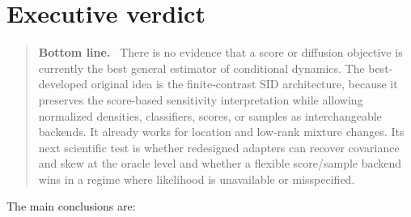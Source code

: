 \documentclass[10pt]{article}
\newenvironment{takeaway}
  {\begin{quote}\color{sidblue}\textbf{Bottom line.}\ }
  {\end{quote}}
\begin{document}
\tableofcontents
\newpage

\section{Executive verdict}

\begin{takeaway}
There is no evidence that a score or diffusion objective is currently the best general estimator of conditional dynamics. The best-developed original idea is the finite-contrast SID architecture, because it preserves the score-based sensitivity interpretation while allowing normalized densities, classifiers, scores, or samples as interchangeable backends. It already works for location and low-rank mixture changes. Its next scientific test is whether redesigned adapters can recover covariance and skew at the oracle level and whether a flexible score/sample backend wins in a regime where likelihood is unavailable or misspecified.
\end{takeaway}

The main conclusions are:
\end{document}

